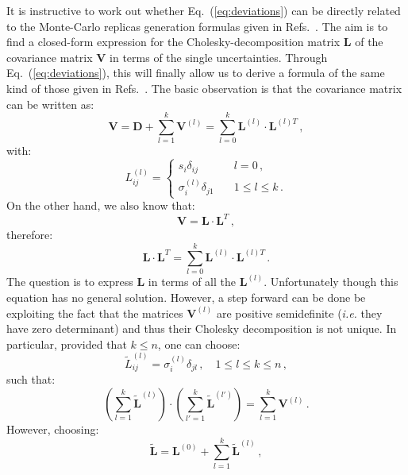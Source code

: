 \documentclass[10pt,a4paper]{article}
\begin{document}
It is instructive to work out whether Eq.~(\ref{eq:deviations}) can be
directly related to the Monte-Carlo replicas generation formulas given
in Refs.~\cite{Ball:2008by, Ball:2014uwa}. The aim is to find a
closed-form expression for the Cholesky-decomposition matrix
$\mathbf{L}$ of the covariance matrix $\mathbf{V}$ in terms of the
single uncertainties. Through Eq.~(\ref{eq:deviations}), this will
finally allow us to derive a formula of the same kind of those given
in Refs.~\cite{Ball:2008by, Ball:2014uwa}. The basic observation is
that the covariance matrix can be written as:
\begin{equation}
\mathbf{V} = \mathbf{D}+ \sum_{l=1}^k 
\mathbf{V}^{(l)} = \sum_{l=0}^k \mathbf{L}^{(l)}\cdot \mathbf{L}^{(l)T}\,,
\end{equation}
with:
\begin{equation}
L_{ij}^{(l)}=\left\{
\begin{array}{ll}
s_i\delta_{ij}&\quad l = 0\,,\\
\sigma_i^{(l)}\delta_{j1}&\quad 1\leq l\leq k\,.
\end{array}
\right.
\end{equation}
On the other hand, we also know that:
\begin{equation}
  \mathbf{V} = \mathbf{L}\cdot \mathbf{L}^T\,,
\end{equation}
therefore:
\begin{equation}
  \mathbf{L}\cdot \mathbf{L}^T=\sum_{l=0}^k \mathbf{L}^{(l)}\cdot \mathbf{L}^{(l)T}\,.
\end{equation}
The question is to express $\mathbf{L}$ in terms of all the
$\mathbf{L}^{(l)}$. Unfortunately though this equation has no general
solution. However, a step forward can be done be exploiting the fact
that the matrices $\mathbf{V}^{(l)}$ are positive semidefinite
(\textit{i.e.} they have zero determinant) and thus their Cholesky
decomposition is not unique. In particular, provided that $k\leq n$,
one can choose:
\begin{equation}\label{eq:choldecomp2}
\widetilde{L}_{ij}^{(l)}=
\sigma_i^{(l)}\delta_{jl}\,,\quad 1\leq l\leq k\leq n\,,
\end{equation}
such that:
\begin{equation}
  \left(\sum_{l=1}^k\widetilde{\mathbf{L}}^{(l)}\right)\cdot\left(
    \sum_{l'=1}^k\widetilde{\mathbf{L}}^{(l')}\right)=\sum_{l=1}^k 
  \mathbf{V}^{(l)}\,.
\end{equation}
However, choosing:
\begin{equation}\label{eq:CholVapprox}
\widetilde{\mathbf{L}} = \mathbf{L}^{(0)} + \sum_{l=1}^k\widetilde{\mathbf{L}}^{(l)}\,,
\end{equation}
\end{document}
